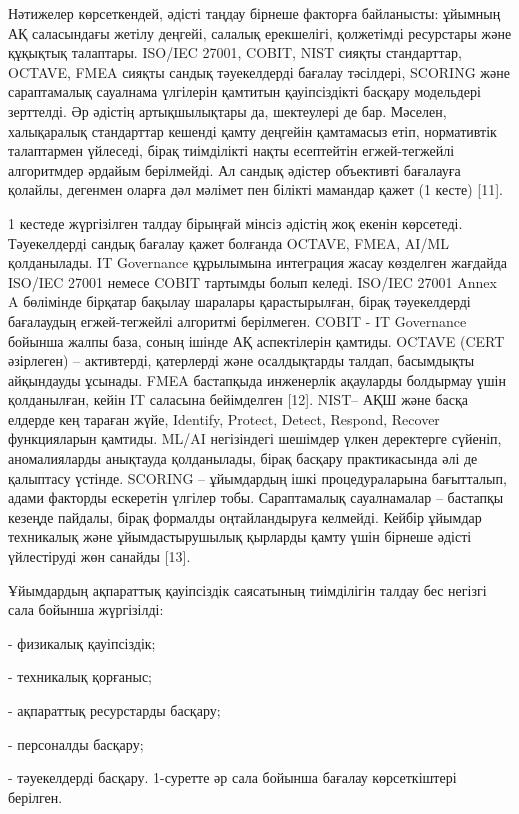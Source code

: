 \begin{multicols}{2}
Нәтижелер көрсеткендей, әдісті таңдау бірнеше факторға байланысты:
ұйымның АҚ саласындағы жетілу деңгейі, салалық ерекшелігі, қолжетімді
ресурстары және құқықтық талаптары. ISO/IEC 27001, COBIT, NIST сияқты
стандарттар, OCTAVE, FMEA сияқты сандық тәуекелдерді бағалау тәсілдері,
SCORING және сараптамалық сауалнама үлгілерін қамтитын қауіпсіздікті
басқару модельдері зерттелді. Әр әдістің артықшылықтары да, шектеулері
де бар. Мәселен, халықаралық стандарттар кешенді қамту деңгейін
қамтамасыз етіп, нормативтік талаптармен үйлеседі, бірақ тиімділікті
нақты есептейтін егжей-тегжейлі алгоритмдер әрдайым берілмейді. Ал
сандық әдістер объективті бағалауға қолайлы, дегенмен оларға дәл мәлімет
пен білікті мамандар қажет (1 кесте) {[}11{]}.

1 кестеде жүргізілген талдау бірыңғай мінсіз әдістің жоқ екенін
көрсетеді. Тәуекелдерді сандық бағалау қажет болғанда OCTAVE, FMEA,
AI/ML қолданылады. IT Governance құрылымына интеграция жасау көзделген
жағдайда ISO/IEC 27001 немесе COBIT тартымды болып келеді. ISO/IEC 27001
Annex A бөлімінде бірқатар бақылау шаралары қарастырылған, бірақ
тәуекелдерді бағалаудың егжей-тегжейлі алгоритмі берілмеген. COBIT - IT
Governance бойынша жалпы база, соның ішінде АҚ аспектілерін қамтиды.
OCTAVE (CERT әзірлеген) -- активтерді, қатерлерді және осалдықтарды
талдап, басымдықты айқындауды ұсынады. FMEA бастапқыда инженерлік
ақауларды болдырмау үшін қолданылған, кейін IT саласына бейімделген
{[}12{]}. NIST-- АҚШ және басқа елдерде кең тараған жүйе, Identify,
Protect, Detect, Respond, Recover функцияларын қамтиды. ML/AI
негізіндегі шешімдер үлкен деректерге сүйеніп, аномалияларды анықтауда
қолданылады, бірақ басқару практикасында әлі де қалыптасу үстінде.
SCORING -- ұйымдардың ішкі процедураларына бағытталып, адами факторды
ескеретін үлгілер тобы. Сараптамалық сауалнамалар -- бастапқы кезеңде
пайдалы, бірақ формалды оңтайландыруға келмейді. Кейбір ұйымдар
техникалық және ұйымдастырушылық қырларды қамту үшін бірнеше әдісті
үйлестіруді жөн санайды {[}13{]}.

Ұйымдардың ақпараттық қауіпсіздік саясатының тиімділігін талдау бес
негізгі сала бойынша жүргізілді:

- физикалық қауіпсіздік;

- техникалық қорғаныс;

- ақпараттық ресурстарды басқару;

- персоналды басқару;

- тәуекелдерді басқару.
1-суретте әр сала бойынша бағалау көрсеткіштері берілген.
\end{multicols}

